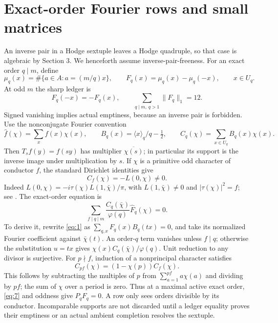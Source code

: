 \documentclass[11pt]{amsart}
\numberwithin{theorem}{section}
\theoremstyle{remark}
\numberwithin{equation}{section}
\begin{document}
\section{Exact-order Fourier rows and small matrices}\label{sec:6}

An inverse pair in a Hodge sextuple leaves a Hodge quadruple, so that case
is algebraic by Section 3. We henceforth assume inverse-pair-freeness.
For an exact order \(q\mid m\), define
\[
\mu_q(x)=\#\{a\in A:a=(m/q)x\},\qquad
F_q(x)=\mu_q(x)-\mu_q(-x),\qquad x\in U_q.
\]
At odd \(m\) the sharp ledger is
\[
F_q(-x)=-F_q(x),\qquad
\sum_{q\mid m,\ q>1}\|F_q\|_1=12.
\tag{6}\label{eq:6}
\]
Signed vanishing implies actual emptiness, because an inverse pair is
forbidden. Use the nonconjugate Fourier convention
\[
\widehat f(\chi)=\sum_x f(x)\chi(x),\qquad
B_q(x)=\langle x\rangle_q/q-\tfrac12,\qquad
C_q(\chi)=\sum_{x\in U_q}B_q(x)\chi(x).
\]
Then \(T_sf(y)=f(sy)\) has multiplier \(\overline{\chi(s)}\); in
particular its support is the inverse image under multiplication by \(s\).
If \(\chi\) is a primitive odd character of conductor \(f\), the
standard Dirichlet identities give
\[
C_f(\chi)=-L(0,\chi)\ne0.
\]
Indeed \(L(0,\chi)=-i\tau(\chi)L(1,\bar\chi)/\pi\), with
\(L(1,\bar\chi)\ne0\) and \(|\tau(\chi)|^2=f\); see
\cite[equations 25.15.5, 25.15.9, 25.15.10, and 27.10.11]{dlmf}. The exact-order
equation is
\[
\sum_{f\mid q\mid m}\frac{C_q(\bar\chi)}{\varphi(q)}
\widehat F_q(\chi)=0.
\tag{7}\label{eq:7}
\]
To derive it, rewrite \eqref{eq:1} as \(\sum_{q,x}F_q(x)B_q(tx)=0\), and take
its normalized Fourier coefficient against \(\bar\chi(t)\). An
order-\(q\) term vanishes unless \(f\mid q\); otherwise the substitution
\(u=tx\) gives \(\chi(x)C_q(\bar\chi)/\varphi(q)\). Unit reduction to
any divisor is surjective. For \(p\nmid f\), induction of a nonprincipal
character satisfies
\[
C_{pf}(\chi)=(1-\chi(p))C_f(\chi).
\tag{8}\label{eq:8}
\]
This follows by subtracting the multiples of \(p\) from
\(\sum_{a=1}^{pf}a\chi(a)\) and dividing by \(pf\); the sum of
\(\chi\) over a period is zero. Thus at a maximal active exact order,
\eqref{eq:7} and oddness give \(P_qF_q=0\). A row only sees orders divisible by
its conductor. Incomparable supports are not discarded until a ledger
equality proves their emptiness or an actual ambient completion resolves
the sextuple.
\end{document}
